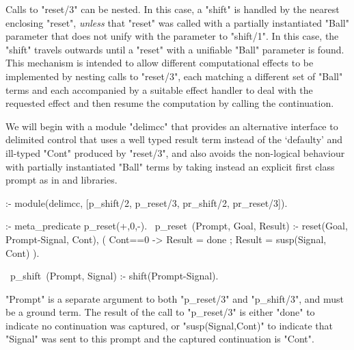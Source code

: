 Calls to "reset/3" can be nested.  In this case, a "shift" is handled by the nearest
enclosing "reset", \emph{unless} that "reset" was called with a partially instantiated "Ball" parameter
that does not unify with the parameter to "shift/1". In this case, the "shift" travels outwards
until a "reset" with a unifiable "Ball" parameter is found. This mechanism is intended to allow different
computational effects to be implemented by nesting calls to "reset/3", each matching a different set of
"Ball" terms and each accompanied by a suitable effect handler to deal with the requested effect and then 
resume the computation by calling the continuation.

We will begin with a module "delimcc" that provides an alternative interface to delimited control that
uses a well typed result term instead of the `defaulty' and ill-typed "Cont" produced by "reset/3",
and also avoids the non-logical behaviour with partially instantiated "Ball" terms by taking instead
an explicit first class prompt
as in  and  libraries. 
\begin{prolog-framed}[name=delimcc]
  :- module(delimcc, [p_shift/2, p_reset/3, pr_shift/2, pr_reset/3]).

  :- meta_predicate p_reset(+,0,-).
  ~p_reset~(Prompt, Goal, Result) :-
    reset(Goal, Prompt-Signal, Cont),
    ( Cont==0 -> Result = done
    ; Result = susp(Signal, Cont)
    ).

  ~p_shift~(Prompt, Signal) :- shift(Prompt-Signal).
\end{prolog-framed}
"Prompt" is a separate argument to both "p_reset/3" and "p_shift/3", and must be a
ground term. The result of the call to "p_reset/3" is either "done" to indicate no continuation
was captured, or "susp(Signal,Cont)" to indicate that "Signal" was sent to this prompt and
the captured continuation is "Cont".

